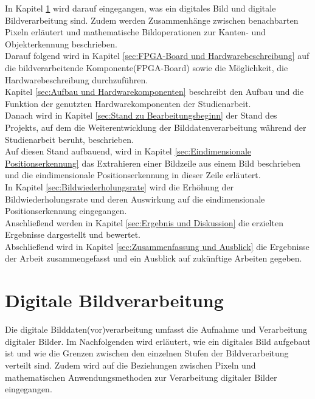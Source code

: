 \documentclass[ngerman,12pt]{article} %
\begin{document}
In Kapitel \ref{sec:Digitale Bildverarbeitung} wird darauf eingegangen, was ein digitales Bild und digitale Bildverarbeitung sind. Zudem werden Zusammenhänge zwischen benachbarten Pixeln erläutert und mathematische Bildoperationen zur Kanten- und Objekterkennung beschrieben.\\
Darauf folgend wird in Kapitel \ref{sec:FPGA-Board und Hardwarebeschreibung} auf die bildverarbeitende Komponente(FPGA-Board) sowie die Möglichkeit, die Hardwarebeschreibung durchzuführen.\\
Kapitel \ref{sec:Aufbau und Hardwarekomponenten} beschreibt den Aufbau und die Funktion der genutzten Hardwarekomponenten der Studienarbeit.\\
Danach wird in Kapitel \ref{sec:Stand zu Bearbeitungsbeginn} der Stand des Projekts, auf dem die Weiterentwicklung der Bilddatenverarbeitung während der Studienarbeit beruht, beschrieben.\\
Auf diesen Stand aufbauend, wird in Kapitel \ref{sec:Eindimensionale Positionserkennung} das Extrahieren einer Bildzeile aus einem Bild beschrieben und die eindimensionale Positionserkennung in dieser Zeile erläutert.\\
In Kapitel \ref{sec:Bildwiederholungsrate} wird die Erhöhung der Bildwiederholungsrate und deren Auswirkung auf die eindimensionale Positionserkennung eingegangen.\\
Anschließend werden in Kapitel \ref{sec:Ergebnis und Diskussion} die erzielten Ergebnisse dargestellt und bewertet.\\
Abschließend wird in Kapitel \ref{sec:Zusammenfassung und Ausblick} die Ergebnisse der Arbeit zusammengefasst und ein Ausblick auf zukünftige Arbeiten gegeben.\\
\clearpage





\section{Digitale Bildverarbeitung}
\label{sec:Digitale Bildverarbeitung}
Die digitale Bilddaten(vor)verarbeitung umfasst die Aufnahme und Verarbeitung digitaler Bilder. Im Nachfolgenden wird erläutert, wie ein digitales Bild aufgebaut ist und wie die Grenzen zwischen den einzelnen Stufen der Bildverarbeitung verteilt sind. Zudem wird auf die Beziehungen zwischen Pixeln und mathematischen Anwendungsmethoden zur Verarbeitung digitaler Bilder eingegangen.
\end{document}
